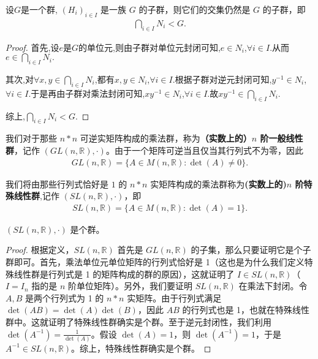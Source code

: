 \documentclass[../../main.tex]{subfiles}
\begin{document}
\begin{proposition}[子群的任意交仍是子群]\label{proposition:子群的任意交仍是子群}
设$G$是一个群, $(H_i)_{i\in I}$ 是一族 $G$ 的子群，则它们的交集仍然是 $G$ 的子群，即
\begin{align*}
\bigcap_{i\in I}N_i< G .
\end{align*}
\end{proposition}
\begin{proof}
首先,设$e$是$G$的单位元,则由子群对单位元封闭可知,$e\in N_i$,$\forall i\in I$.从而$e\in \bigcap_{i\in I}N_i.$

其次,对$\forall x,y\in \bigcap_{i\in I}N_i$,都有$x,y\in N_i$,$\forall i\in I$.根据子群对逆元封闭可知,$y^{-1}\in N_i$,$\forall i\in I$.于是再由子群对乘法封闭可知,$xy^{-1}\in N_i$,$\forall i\in I$.故$xy^{-1}\in \bigcap_{i\in I}N_i.$

综上,$\bigcap_{i\in I}N_i< G .$
\end{proof}

\begin{definition}[一般线性群]
我们对于那些 $n*n$ 可逆实矩阵构成的乘法群，称为\textbf{（实数上的）$n$ 阶一般线性群}，记作 $(GL(n, \mathbb{R}), \cdot)$。由于一个矩阵可逆当且仅当其行列式不为零，因此
\begin{align*}
GL(n, \mathbb{R}) = \{A \in M(n, \mathbb{R}) : \det(A) \neq 0\}.
\end{align*} 
\end{definition}

\begin{definition}[特殊线性群]
我们将由那些行列式恰好是 $1$ 的 $n*n$ 实矩阵构成的乘法群称为\textbf{(实数上的)$n$ 阶特殊线性群},记作 $(SL(n, \mathbb{R}), \cdot)$，即
\begin{align*}
SL(n, \mathbb{R}) = \{A \in M(n, \mathbb{R}) : \det(A) = 1\}.
\end{align*} 
\end{definition}

\begin{proposition}
$(SL(n, \mathbb{R}), \cdot)$ 是个群。
\end{proposition}
\begin{proof}
根据定义，$SL(n, \mathbb{R})$ 首先是 $GL(n, \mathbb{R})$ 的子集，那么只要证明它是个子群即可。首先，乘法单位元单位矩阵的行列式恰好是 1（这也是为什么我们定义特殊线性群是行列式是 1 的矩阵构成的群的原因），这就证明了 $I \in SL(n, \mathbb{R})$（$I = I_n$ 指的是 $n$ 阶单位矩阵）。另外，我们要证明 $SL(n, \mathbb{R})$ 在乘法下封闭。令 $A, B$ 是两个行列式为 1 的 $n*n$ 实矩阵。由于行列式满足 $\det(AB) = \det(A)\det(B)$，因此 $AB$ 的行列式也是 1，也就在特殊线性群中。这就证明了特殊线性群确实是个群。至于逆元封闭性，我们利用 $\det(A^{-1}) = \frac{1}{\det(A)}$。假设 $\det(A) = 1$，则 $\det(A^{-1}) = 1$，于是 $A^{-1} \in SL(n, \mathbb{R})$。综上，特殊线性群确实是个群。 
\end{proof}
\end{document}
